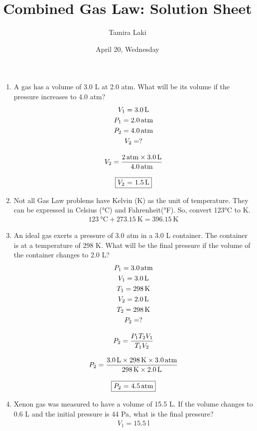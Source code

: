 \documentclass[12pt, a4paper]{article}
\title{Combined Gas Law: Solution Sheet}
\author{Tamira Laki}
\date{April 20, Wednesday}
\begin{document}
\maketitle

\begin{enumerate}
	\item A gas has a volume of 3.0 L at 2.0 atm. What will be its volume if the pressure increases to 4.0 atm?
		\begin{gather*}
		V_1 = \SI{3.0}{\l}\\
		P_1 = \SI{2.0}{atm}\\
		P_2 = \SI{4.0}{atm}\\
		V_2 = ?\\[3mm]
		V_2 = \dfrac{\SI{2}{atm} \times\SI{3.0}{\l}}{\SI{4.0}{atm}}\\[3mm]
		\fbox{$V_2$ = \SI{1.5}{\l}}
		\end{gather*}
	\item Not all Gas Law problems have Kelvin (K) as the unit of temperature. They can be expressed in Celsius (°C) and Fahrenheit(°F). So, convert 123°C to K.
		\begin{gather*}
		\SI{123}{\celsius} + \SI{273.15}{\kelvin} = \SI{396.15}{\kelvin}
		\end{gather*}
	\item An ideal gas exerts a pressure of 3.0 atm in a 3.0 L container. The container is at a temperature of 298 K. What will be the final pressure if the volume of the container changes to 2.0 L?
		\begin{gather*}
		P_1 = \SI{3.0}{atm}\\
		V_1 = \SI{3.0}{\l}\\
		T_1 = \SI{298}{\kelvin}\\
		V_2 = \SI{2.0}{\l}\\
		T_2 = \SI{298}{\kelvin}\\
		P_2 = ?\\[3mm]
		P_2 = \dfrac{P_1T_2V_1}{T_1V_2}\\[3mm]
		P_2 = \dfrac{\SI{3.0}{\l} \times \SI{298}{\kelvin} \times \SI{3.0}{atm}}{\SI{298}{\kelvin} \times \SI{2.0}{\l}}\\[3mm]
		\fbox{$P_2$ = \SI{4.5}{atm}}
		\end{gather*}
	\item Xenon gas was measured to have a volume of 15.5 L. If the volume changes to 0.6 L and the initial pressure is 44 Pa, what is the final pressure? 
		\begin{gather*}
		V_1 = \SI{15.5}{\l}\\

\end{gather*}
\end{enumerate}
\end{document}

